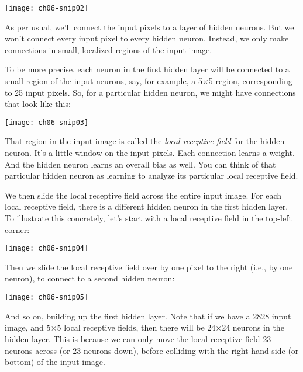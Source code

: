 \begin{marginfigure}
    \texttt{[image: ch06-snip02]}
    \end{marginfigure}

As per usual, we'll connect the input pixels to a layer of hidden neurons. But we won't connect every input pixel to every hidden neuron. Instead, we only make connections in small, localized regions of the input image.

To be more precise, each neuron in the first hidden layer will be connected to a small region of the input neurons, say, for example, a 5$\times$5 region, corresponding to 25 input pixels. So, for a particular hidden neuron, we might have connections that look like this: 
\begin{marginfigure}
    \texttt{[image: ch06-snip03]}
    \end{marginfigure}

That region in the input image is called the \textit{local receptive field} for the hidden neuron. It's a little window on the input pixels. Each connection learns a weight. And the hidden neuron learns an overall bias as well. You can think of that particular hidden neuron as learning to analyze its particular local receptive field.

We then slide the local receptive field across the entire input image. For each local receptive field, there is a different hidden neuron in the first hidden layer. To illustrate this concretely, let's start with a local receptive field in the top-left corner: 

\begin{figure*}[tph]
    \texttt{[image: ch06-snip04]}
    \end{figure*}

Then we slide the local receptive field over by one pixel to the right (i.e., by one neuron), to connect to a second hidden neuron:

\begin{figure*}[tph]
    \texttt{[image: ch06-snip05]}
    \end{figure*}

And so on, building up the first hidden layer. Note that if we have a 2828 input image, and 5$\times$5 local receptive fields, then there will be 24$\times$24 neurons in the hidden layer. This is because we can only move the local receptive field 23 neurons across (or 23 neurons down), before colliding with the right-hand side (or bottom) of the input image.

